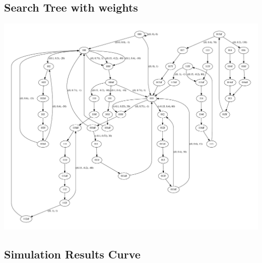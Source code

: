 \documentclass[10pt,a4paper]{article}
\begin{document}
\subsection{Search Tree with weights}
\includegraphics[width=.95\textwidth]{pics/trajectory_planner/tree_detail.pdf}

\subsection{Simulation Results Curve}
\end{document}
